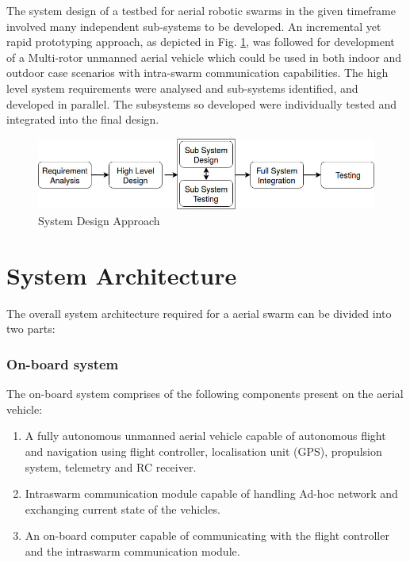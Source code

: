 \begin{spacing}{2}
The system design of a testbed for aerial robotic swarms in the given timeframe involved many independent sub-systems to be developed. An incremental yet rapid prototyping approach, as depicted in Fig. \ref{fig:sysdesign}, was followed for development of a Multi-rotor unmanned aerial vehicle which could be used in both indoor and outdoor case scenarios with intra-swarm communication capabilities. The high level system requirements were analysed and sub-systems identified, and developed in parallel. The subsystems so developed were individually tested and integrated into the final design.
\begin{figure}[h]
    \centering
    \includegraphics[width = \linewidth]{image/Major_sysdes.jpg}
    \caption{System Design Approach}
    \label{fig:sysdesign}
\end{figure}
\section{System Architecture}
The overall system architecture required for a aerial swarm can be divided into two parts:

\subsubsection*{On-board system}
The on-board system comprises of the following components present on the aerial vehicle:
\begin{enumerate}
\item A fully autonomous unmanned aerial vehicle capable of autonomous flight and navigation using flight controller, localisation unit (GPS), propulsion system, telemetry and RC receiver.
\item Intraswarm communication module capable of handling Ad-hoc network and exchanging current state of the vehicles.
\item An on-board computer capable of communicating with the flight controller and the intraswarm communication module.
\end{enumerate}


\end{spacing}
